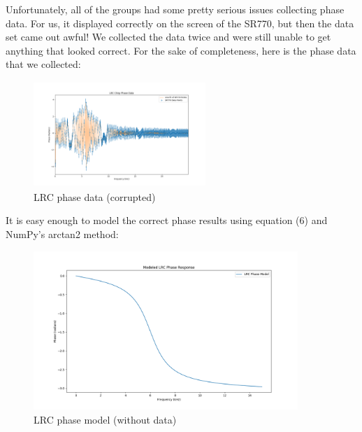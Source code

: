 \documentclass{article}
\begin{document}
Unfortunately, all of the groups had some pretty serious issues collecting
phase data. For us, it displayed correctly on the screen of the SR770, but then
the data set came out awful! We collected the data twice and were still unable
to get anything that looked correct. For the sake of completeness, here is the
phase data that we collected:

\begin{figure}[H]
    \centering
\begin{minipage}{11cm}
\begin{tcolorbox}
    \centering
        \includegraphics[width=6.5cm, height=4cm]{figures/figure25.png}
        \caption{LRC phase data (corrupted)}
        \label{fig:fig25}
\end{tcolorbox}
\end{minipage}
\end{figure}

It is easy enough to model the correct phase results using equation (6) and
NumPy's arctan2 method:

\begin{figure}[H]
    \centering
\begin{minipage}{11cm}
\begin{tcolorbox}
    \centering
        \includegraphics[width=10cm, height=6cm]{figures/figure26.png}
        \caption{LRC phase model (without data)}
        \label{fig:fig26}
\end{tcolorbox}
\end{minipage}
\end{figure}
\end{document}
